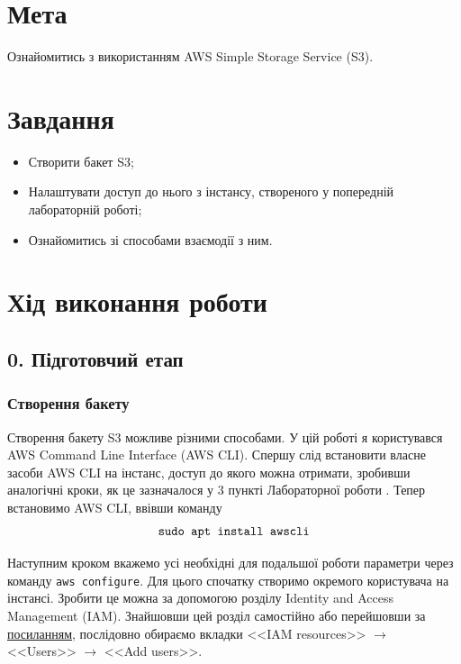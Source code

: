 \documentclass[a4paper,14pt]{extarticle} %
\begin{document}



\newpage

\section*{Мета}

Ознайомитись з використанням AWS Simple Storage Service (S3).

\section*{Завдання} 

\begin{itemize}
    \item Створити бакет S3;
    \item Налаштувати доступ до нього з інстансу, створеного у попередній лабораторній роботі;
    \item Ознайомитись зі способами взаємодії з ним.
\end{itemize}

\section*{Хід виконання роботи}

\subsection*{0. Підготовчий етап}

\subsubsection*{Створення бакету}

Створення бакету S3 можливе різними способами. У цій роботі я користувався AWS Command Line Interface (AWS CLI).
Спершу слід встановити власне засоби AWS CLI на інстанс, доступ до якого можна отримати, зробивши аналогічні 
кроки, як це зазначалося у 3 пункті Лабораторної роботи . Тепер встановимо AWS CLI, ввівши команду
\[ \text{\texttt{sudo apt install awscli}} \]

Наступним кроком вкажемо усі необхідні для подальшої роботи параметри через команду \texttt{aws configure}. Для 
цього спочатку створимо окремого користувача на інстансі. Зробити це можна за допомогою розділу Identity and 
Access Management (IAM). Знайшовши цей розділ самостійно або перейшовши за 
\href{https://us-east-1.console.aws.amazon.com/iamv2/home?region=us-east-1#/home}{посиланням}, послідовно 
обираємо вкладки <<IAM resources>> $\rightarrow$ <<Users>> $\rightarrow$ <<Add users>>.
\end{document}
